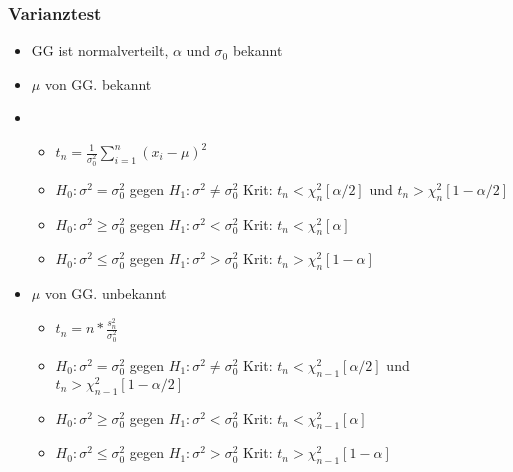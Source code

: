 \documentclass[a4paper]{article}
\begin{document}
\begin{landscape}
\begin{multicols}{4}
        \subsubsection*{Varianztest}
        \begin{itemize}[noitemsep,nolistsep,leftmargin=*]
            \item GG ist normalverteilt, $\alpha$ und $\sigma_0$ bekannt
            \item $\mu $ von GG. bekannt
            \item \begin{itemize}[noitemsep,nolistsep,leftmargin=*]
            \item $t_n= \frac{1}{\sigma^2_0} \sum^n_{i=1} (x_i-\mu)^2$
            \item $H_0: \sigma^2 = \sigma^2_0$ gegen $H_1: \sigma^2 \neq \sigma^2_0$ Krit: $t_n < \chi^2_n[\alpha/2]$ und $t_n > \chi^2_n[1-\alpha/2]$
            \item $H_0: \sigma^2  \geq \sigma^2_0$ gegen $H_1: \sigma^2 < \sigma^2_0$ Krit: $t_n < \chi^2_n[\alpha]$ 
            \item $H_0: \sigma^2  \leq \sigma^2_0$ gegen $H_1: \sigma^2 > \sigma^2_0$ Krit: $t_n > \chi^2_n[1-\alpha]$ 
            \end{itemize}
            \item $\mu $ von GG. unbekannt
            \begin{itemize}[noitemsep,nolistsep,leftmargin=*]
            \item $t_n= n*\frac{s^2_n}{\sigma^2_0}$
            \item $H_0: \sigma^2 = \sigma^2_0$ gegen $H_1: \sigma^2 \neq \sigma^2_0$ Krit: $t_n < \chi^2_{n-1}[\alpha/2]$ und $t_n > \chi^2_{n-1}[1-\alpha/2]$
            \item $H_0: \sigma^2  \geq \sigma^2_0$ gegen $H_1: \sigma^2 < \sigma^2_0$ Krit: $t_n < \chi^2_{n-1}[\alpha]$ 
            \item $H_0: \sigma^2  \leq \sigma^2_0$ gegen $H_1: \sigma^2 > \sigma^2_0$ Krit: $t_n > \chi^2_{n-1}[1-\alpha]$ 
            \end{itemize}
        \end{itemize}


\end{multicols}
\end{landscape}
\end{document}
